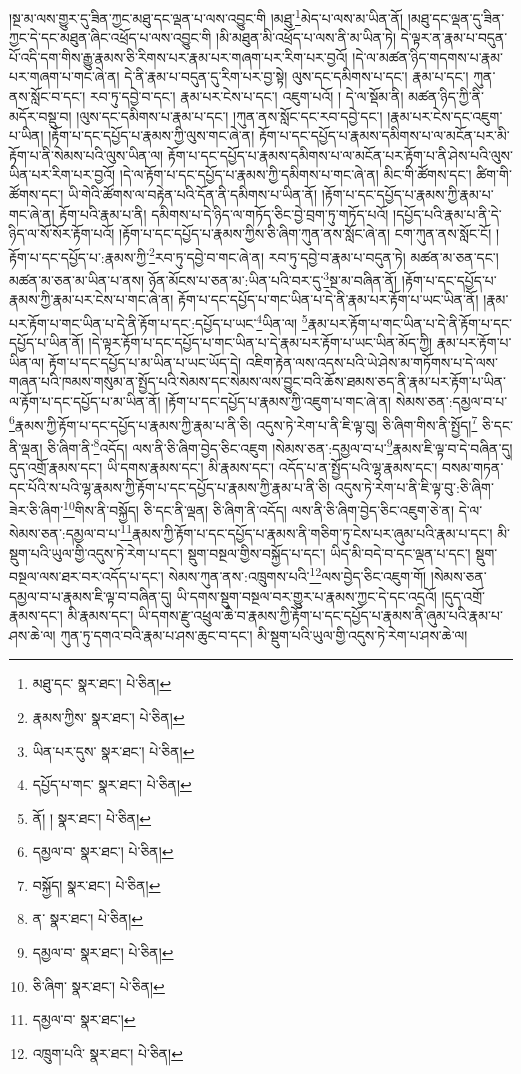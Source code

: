 །སྔ་མ་ལས་གྱུར་དུ་ཟིན་ཀྱང་མཐུ་དང་ལྡན་པ་ལས་འབྱུང་གི །མཐུ་\footnote{མཐུ་དང་  སྣར་ཐང་།  པེ་ཅིན། }མེད་པ་ལས་མ་ཡིན་ནོ། །མཐུ་དང་ལྡན་དུ་ཟིན་ཀྱང་དེ་དང་མཐུན་ཞིང་འཕྲོད་པ་ལས་འབྱུང་གི །མི་མཐུན་མི་འཕྲོད་པ་ལས་ནི་མ་ཡིན་ཏེ། དེ་ལྟར་ན་རྣམ་པ་བདུན་པོ་འདི་དག་གིས་རྒྱུ་རྣམས་ཅི་རིགས་པར་རྣམ་པར་གཞག་པར་རིག་པར་བྱའོ། །དེ་ལ་མཚན་ཉིད་གདགས་པ་རྣམ་པར་གཞག་པ་གང་ཞེ་ན། དེ་ནི་རྣམ་པ་བདུན་དུ་རིག་པར་བྱ་སྟེ། ལུས་དང་དམིགས་པ་དང་། རྣམ་པ་དང་། ཀུན་ནས་སློང་བ་དང་། རབ་ཏུ་དབྱེ་བ་དང་། རྣམ་པར་ངེས་པ་དང་། འཇུག་པའོ། །
དེ་ལ་སྡོམ་ནི། མཚན་ཉིད་ཀྱི་ནི་མདོར་བསྡུ་བ། །ལུས་དང་དམིགས་པ་རྣམ་པ་དང་། །ཀུན་ནས་སློང་དང་རབ་དབྱེ་དང་། །རྣམ་པར་ངེས་དང་འཇུག་པ་ཡིན། །རྟོག་པ་དང་དཔྱོད་པ་རྣམས་ཀྱི་ལུས་གང་ཞེ་ན། རྟོག་པ་དང་དཔྱོད་པ་རྣམས་དམིགས་པ་ལ་མངོན་པར་མི་རྟོག་པ་ནི་སེམས་པའི་ལུས་ཡིན་ལ། རྟོག་པ་དང་དཔྱོད་པ་རྣམས་དམིགས་པ་ལ་མངོན་པར་རྟོག་པ་ནི་ཤེས་པའི་ལུས་ཡིན་པར་རིག་པར་བྱའོ། །དེ་ལ་རྟོག་པ་དང་དཔྱོད་པ་རྣམས་ཀྱི་དམིགས་པ་གང་ཞེ་ན། མིང་གི་ཚོགས་དང་། ཚིག་གི་ཚོགས་དང་། ཡི་གེའི་ཚོགས་ལ་བརྟེན་པའི་དོན་ནི་དམིགས་པ་ཡིན་ནོ། །རྟོག་པ་དང་དཔྱོད་པ་རྣམས་ཀྱི་རྣམ་པ་གང་ཞེ་ན། རྟོག་པའི་རྣམ་པ་ནི། དམིགས་པ་དེ་ཉིད་ལ་གཏོད་ཅིང་བྱེ་བྲག་ཏུ་གཏོད་པའོ། །དཔྱོད་པའི་རྣམ་པ་ནི་དེ་ཉིད་ལ་སོ་སོར་རྟོག་པའོ། །རྟོག་པ་དང་དཔྱོད་པ་རྣམས་ཀྱིས་ཅི་ཞིག་ཀུན་ནས་སློང་ཞེ་ན། ངག་ཀུན་ནས་སློང་ངོ། །རྟོག་པ་དང་དཔྱོད་པ་:རྣམས་ཀྱི་\footnote{རྣམས་ཀྱིས་  སྣར་ཐང་།  པེ་ཅིན། }རབ་ཏུ་དབྱེ་བ་གང་ཞེ་ན། རབ་ཏུ་དབྱེ་བ་རྣམ་པ་བདུན་ཏེ། མཚན་མ་ཅན་དང་། མཚན་མ་ཅན་མ་ཡིན་པ་ནས། ཉོན་མོངས་པ་ཅན་མ་:ཡིན་པའི་བར་དུ་\footnote{ཡིན་པར་དུས་  སྣར་ཐང་།  པེ་ཅིན། }སྔ་མ་བཞིན་ནོ། །རྟོག་པ་དང་དཔྱོད་པ་རྣམས་ཀྱི་རྣམ་པར་ངེས་པ་གང་ཞེ་ན། རྟོག་པ་དང་དཔྱོད་པ་གང་ཡིན་པ་དེ་ནི་རྣམ་པར་རྟོག་པ་ཡང་ཡིན་ནོ། །རྣམ་པར་རྟོག་པ་གང་ཡིན་པ་དེ་ནི་རྟོག་པ་དང་:དཔྱོད་པ་ཡང་\footnote{དཔྱོད་པ་གང་  སྣར་ཐང་།  པེ་ཅིན། }ཡིན་ལ། \footnote{ནོ། །   སྣར་ཐང་།  པེ་ཅིན། }རྣམ་པར་རྟོག་པ་གང་ཡིན་པ་དེ་ནི་རྟོག་པ་དང་དཔྱོད་པ་ཡིན་ནོ། །དེ་ལྟར་རྟོག་པ་དང་དཔྱོད་པ་གང་ཡིན་པ་དེ་རྣམ་པར་རྟོག་པ་ཡང་ཡིན་མོད་ཀྱི། རྣམ་པར་རྟོག་པ་ཡིན་ལ། རྟོག་པ་དང་དཔྱོད་པ་མ་ཡིན་པ་ཡང་ཡོད་དེ། འཇིག་རྟེན་ལས་འདས་པའི་ཡེ་ཤེས་མ་གཏོགས་པ་དེ་ལས་གཞན་པའི་ཁམས་གསུམ་ན་སྤྱོད་པའི་སེམས་དང་སེམས་ལས་བྱུང་བའི་ཆོས་ཐམས་ཅད་ནི་རྣམ་པར་རྟོག་པ་ཡིན་ལ་རྟོག་པ་དང་དཔྱོད་པ་མ་ཡིན་ནོ། །རྟོག་པ་དང་དཔྱོད་པ་རྣམས་ཀྱི་འཇུག་པ་གང་ཞེ་ན། སེམས་ཅན་:དམྱལ་བ་པ་\footnote{དམྱལ་བ་  སྣར་ཐང་།  པེ་ཅིན། }རྣམས་ཀྱི་རྟོག་པ་དང་དཔྱོད་པ་རྣམས་ཀྱི་རྣམ་པ་ནི་ཅི། འདུས་ཏེ་རེག་པ་ནི་ཇི་ལྟ་བུ། ཅི་ཞིག་གིས་ནི་སྤྱོད།\footnote{བསྐྱོད།  སྣར་ཐང་།  པེ་ཅིན། } ཅི་དང་ནི་ལྡན། ཅི་ཞིག་ནི་\footnote{ན་  སྣར་ཐང་།  པེ་ཅིན། }འདོད། ལས་ནི་ཅི་ཞིག་བྱེད་ཅིང་འཇུག །སེམས་ཅན་:དམྱལ་བ་པ་\footnote{དམྱལ་བ་  སྣར་ཐང་།  པེ་ཅིན། }རྣམས་ཇི་ལྟ་བ་དེ་བཞིན་དུ། དུད་འགྲོ་རྣམས་དང་། ཡི་དགས་རྣམས་དང་། མི་རྣམས་དང་། འདོད་པ་ན་སྤྱོད་པའི་ལྷ་རྣམས་དང་། བསམ་གཏན་དང་པོའི་ས་པའི་ལྷ་རྣམས་ཀྱི་རྟོག་པ་དང་དཔྱོད་པ་རྣམས་ཀྱི་རྣམ་པ་ནི་ཅི། འདུས་ཏེ་རེག་པ་ནི་ཇི་ལྟ་བུ་:ཅི་ཞིག་ཟེར་ཅི་ཞིག་\footnote{ཅི་ཞིག་  སྣར་ཐང་།  པེ་ཅིན། }གིས་ནི་བསྐྱོད། ཅི་དང་ནི་ལྡན། ཅི་ཞིག་ནི་འདོད། ལས་ནི་ཅི་ཞིག་བྱེད་ཅིང་འཇུག་ཅེ་ན། དེ་ལ་སེམས་ཅན་:དམྱལ་བ་པ་\footnote{དམྱལ་བ་  སྣར་ཐང་། }རྣམས་ཀྱི་རྟོག་པ་དང་དཔྱོད་པ་རྣམས་ནི་གཅིག་ཏུ་ངེས་པར་ཞུམ་པའི་རྣམ་པ་དང་། མི་སྡུག་པའི་ཡུལ་གྱི་འདུས་ཏེ་རེག་པ་དང་། སྡུག་བསྔལ་གྱིས་བསྐྱོད་པ་དང་། ཡིད་མི་བདེ་བ་དང་ལྡན་པ་དང་། སྡུག་བསྔལ་ལས་ཐར་བར་འདོད་པ་དང་། སེམས་ཀུན་ནས་:འཁྲུགས་པའི་\footnote{འཁྲུག་པའི་  སྣར་ཐང་།  པེ་ཅིན། }ལས་བྱེད་ཅིང་འཇུག་གོ། །སེམས་ཅན་དམྱལ་བ་པ་རྣམས་ཇི་ལྟ་བ་བཞིན་དུ། ཡི་དགས་སྡུག་བསྔལ་བར་གྱུར་པ་རྣམས་ཀྱང་དེ་དང་འདྲའོ། །དུད་འགྲོ་རྣམས་དང་། མི་རྣམས་དང་། ཡི་དགས་རྫུ་འཕྲུལ་ཆེ་བ་རྣམས་ཀྱི་རྟོག་པ་དང་དཔྱོད་པ་རྣམས་ནི་ཞུམ་པའི་རྣམ་པ་ཤས་ཆེ་ལ། ཀུན་ཏུ་དགའ་བའི་རྣམ་པ་ཤས་ཆུང་བ་དང་། མི་སྡུག་པའི་ཡུལ་གྱི་འདུས་ཏེ་རེག་པ་ཤས་ཆེ་ལ། 